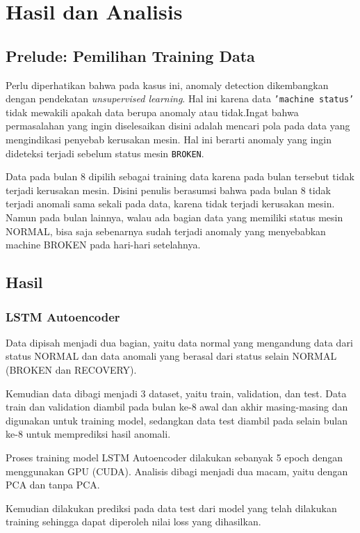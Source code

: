 \chapter{Hasil dan Analisis}

\section{Prelude: Pemilihan Training Data}

Perlu diperhatikan bahwa pada kasus ini, anomaly detection dikembangkan dengan pendekatan \emph{unsupervised learning}. Hal ini karena data \texttt{'machine status'} tidak mewakili apakah data berupa anomaly atau tidak.Ingat bahwa permasalahan yang ingin diselesaikan disini adalah mencari pola pada data yang mengindikasi penyebab kerusakan mesin. Hal ini berarti anomaly yang ingin dideteksi terjadi sebelum status mesin \texttt{BROKEN}. 

Data pada bulan 8 dipilih sebagai training data karena pada bulan tersebut tidak terjadi kerusakan mesin. Disini penulis berasumsi bahwa pada bulan 8 tidak terjadi anomali sama sekali pada data, karena tidak terjadi kerusakan mesin. Namun pada bulan lainnya, walau ada bagian data yang memiliki status mesin NORMAL, bisa saja sebenarnya sudah terjadi anomaly yang menyebabkan machine BROKEN pada hari-hari setelahnya.

\section{Hasil}
\subsection{LSTM Autoencoder}

Data dipisah menjadi dua bagian, yaitu data normal yang mengandung data dari status NORMAL dan data anomali yang berasal dari status selain NORMAL (BROKEN dan RECOVERY).

Kemudian data dibagi menjadi 3 dataset, yaitu train, validation, dan test. Data train dan validation diambil pada bulan ke-8 awal dan akhir masing-masing dan digunakan untuk training model, sedangkan data test diambil pada selain bulan ke-8 untuk memprediksi hasil anomali.

Proses training model LSTM Autoencoder dilakukan sebanyak 5 epoch dengan menggunakan GPU (CUDA). Analisis dibagi menjadi dua macam, yaitu dengan PCA dan tanpa PCA.

Kemudian dilakukan prediksi pada data test dari model yang telah dilakukan training sehingga dapat diperoleh nilai loss yang dihasilkan.

